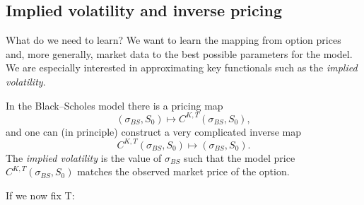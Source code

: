 \documentclass[11pt,a4paper]{article}
\theoremstyle{definition}
\theoremstyle{plain}
\theoremstyle{remark}
\begin{document}
\subsection{Implied volatility and inverse pricing}

What do we need to learn?
We want to learn the mapping from option prices and, more generally, market data to 
the best possible parameters for the model.
We are especially interested in approximating key functionals such as the \emph{implied volatility}.

\begin{tcolorbox}[colback=green!3!white,colframe=green!50!black,title={\textbf{Pricing and implied-volatility maps}}]
In the Black--Scholes model there is a pricing map
\begin{equation}
    (\sigma_{BS}, S_0) \mapsto C^{K,T}(\sigma_{BS}, S_0),
\end{equation}
and one can (in principle) construct a very complicated inverse map
\begin{equation}
    C^{K,T}(\sigma_{BS}, S_0) \mapsto (\sigma_{BS}, S_0).
\end{equation}
The \emph{implied volatility} is the value of $\sigma_{BS}$ such that the model price $C^{K,T}(\sigma_{BS}, S_0)$
matches the observed market price of the option.
\end{tcolorbox}

If we now fix T:
\end{document}
